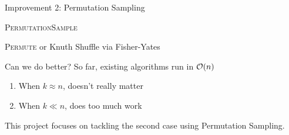 %
%
%

\begin{frame}{Improvement 2: Permutation Sampling}
  \begin{algorithm}[H]
    \caption{\textsc{PermutationSample}}
  \begin{algorithmic}

  \end{algorithmic}
  \end{algorithm}
  \vspace{-1em}
  \begin{algorithm}[H]
    \caption{\textsc{Permute} or Knuth Shuffle via Fisher-Yates}
  \begin{algorithmic}
    \EndFor
  \end{algorithmic}
  \end{algorithm}
\end{frame}

\begin{frame}{Can we do better?}
  So far, existing algorithms run in \(\mathcal{O}(n)\)
  \begin{enumerate}
    \item When \(k \approx n\), doesn't really matter
    \item When \(k \ll n\), does too much work
  \end{enumerate}

  This project focuses on tackling the second case using Permutation Sampling.
\end{frame}

